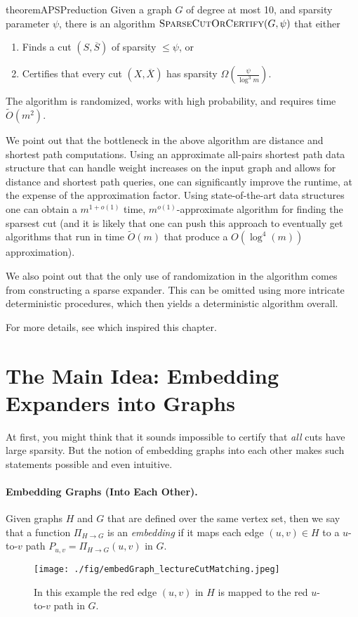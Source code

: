 \begin{restatable}{theorem}{APSPreduction}\label{thm:fineGrainedReduction}
\label{theorem:balanceCut}
Given a graph $G$ of degree at most 10, and sparsity parameter $\psi$, there is an algorithm $\textsc{SparseCutOrCertify}(G, \psi)$ that either
\begin{enumerate}
    \item\label{case:balanceCut} Finds a cut $(S, \overline{S})$ of sparsity $\leq \psi$, or
    \item\label{case:noBalanceCut}
     Certifies that every cut $(X, \overline{X})$ has sparsity
  $\Omega\left(\frac{\psi}{ \log^3 m}\right).$
\end{enumerate}
The algorithm is randomized, works with high probability,  and requires time $\tilde{O}(m^2)$.
\end{restatable}

We point out that the bottleneck in the above algorithm are distance and shortest path computations. Using an approximate all-pairs shortest path data structure that can handle weight increases on the input graph and allows for distance and shortest path queries, one can significantly improve the runtime, at the expense of the approximation factor. Using state-of-the-art data structures \cite{chuzhoy2021decremental, bernstein2022deterministic} one can obtain a $m^{1+o(1)}$ time, $m^{o(1)}$-approximate algorithm for finding the sparsest cut (and it is likely that one can push this approach to eventually get algorithms that run in time $\tilde{O}(m)$ that produce a $O(\log^4(m))$ approximation).

We also point out that the only use of randomization in the algorithm comes from constructing a sparse expander. This can be omitted using more intricate deterministic procedures, which then yields a deterministic algorithm overall.

For more details, see \cite{chen2023simple} which inspired this chapter.

\section{The Main Idea: Embedding Expanders into Graphs}

At first, you might think that it sounds impossible to certify that \emph{all} cuts have large sparsity. But the notion of embedding graphs into each other makes such statements possible and even intuitive.

\paragraph{Embedding Graphs (Into Each Other).} Given graphs $H$ and $G$ that are defined over the same vertex set, then we say that a function $\Pi_{H \xrightarrow{} G}$ is an \emph{embedding} if it maps each edge $(u,v) \in H$ to a $u$-to-$v$ path $P_{u,v} = \Pi_{H \xrightarrow{} G}(u,v)$ in $G$. 
\begin{figure}[!ht]
    \centering
    \texttt{[image: ./fig/embedGraph\_lectureCutMatching.jpeg]}
    \caption{In this example the red edge $(u,v)$ in $H$ is mapped to the red $u$-to-$v$ path in $G$.}
\end{figure}

